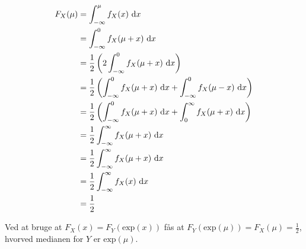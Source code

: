 \begin{align*}
F_X(\mu) &= \int_{-\infty}^\mu f_X(x)\ \mathrm{d} x \\
&=\int_{-\infty}^0 f_X(\mu + x)\ \mathrm{d} x \\
&=\frac{1}{2}\left(2\int_{-\infty}^0 f_X(\mu + x)\ \mathrm{d} x\right) \\
&=\frac{1}{2}\left(\int_{-\infty}^0 f_X(\mu + x)\ \mathrm{d} x + \int_{-\infty}^0 f_X(\mu - x)\ \mathrm{d} x\right) \\
&=\frac{1}{2}\left(\int_{-\infty}^0 f_X(\mu + x)\ \mathrm{d} x + \int_0^\infty f_X(\mu + x)\ \mathrm{d} x\right) \\
&=\frac{1}{2}\int_{-\infty}^\infty f_X(\mu + x)\ \mathrm{d} x \\
&=\frac{1}{2}\int_{-\infty}^\infty f_X(\mu + x)\ \mathrm{d} x \\
&=\frac{1}{2}\int_{-\infty}^\infty f_X(x)\ \mathrm{d} x \\
&=\frac{1}{2}
\end{align*}

Ved at bruge at $F_X(x) = F_Y(\mathrm{exp}(x))$ fås at
$F_Y(\mathrm{exp}(\mu)) = F_X(\mu) = \frac{1}{2}$, hvorved medianen for $Y$
er $\mathrm{exp}(\mu)$.
